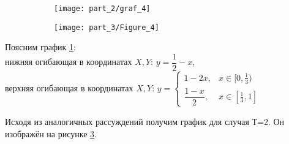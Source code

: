 \begin{figure}[H]
	\centering
	\begin{subfigure}[b]{0.47 \textwidth}
		\centering		
		\texttt{[image: part\_2/graf\_4]}
		\caption{}
		\label{fig:EG_1}
	\end{subfigure}	
	\begin{subfigure}[b]{0.47 \textwidth}
		\centering		
		\texttt{[image: part\_3/Figure\_4]}
		\caption{}
		\label{fig:EG_2}
	\end{subfigure}
	\caption{}	
\end{figure}

\begin{flushleft}
	Поясним график \ref{fig:EG_1}: \\
	нижняя огибающая в координатах $X,Y$: $y=\dfrac{1}{2}-x$, \\
	верхняя огибающая в координатах $X,Y$: 
	$y=
	\begin{cases}
		1 - 2x, & x \in [0, \frac{1}{3}) \\
		\dfrac{1 - x}{2}, & x \in [\frac{1}{3}, 1]
	\end{cases}
$
\end{flushleft}

Исходя из аналогичных рассуждений получим график для случая Т=2. Он изображён
на рисунке \ref{fig:EG_2}.

